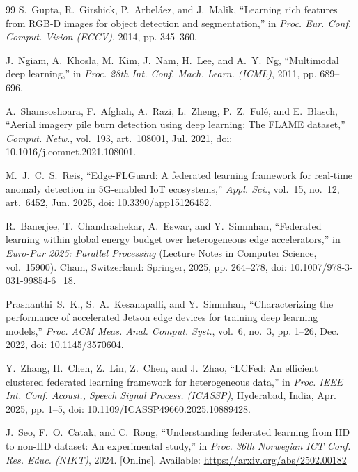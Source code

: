 \documentclass[journal]{IEEEtran}
\begin{document}
\begin{thebibliography}{99}
S.~Gupta, R.~Girshick, P.~Arbel\'{a}ez, and J.~Malik, ``Learning rich features from RGB-D images for object detection and segmentation,'' in \emph{Proc. Eur. Conf. Comput. Vision (ECCV)}, 2014, pp. 345--360.

J.~Ngiam, A.~Khosla, M.~Kim, J.~Nam, H.~Lee, and A.~Y.~Ng, ``Multimodal deep learning,'' in \emph{Proc. 28th Int. Conf. Mach. Learn. (ICML)}, 2011, pp. 689--696.


A.~Shamsoshoara, F.~Afghah, A.~Razi, L.~Zheng, P.~Z.~Ful\'{e}, and E.~Blasch, ``Aerial imagery pile burn detection using deep learning: The FLAME dataset,'' \emph{Comput. Netw.}, vol.~193, art.~108001, Jul. 2021, doi: 10.1016/j.comnet.2021.108001.

M.~J.~C.~S.~Reis, ``Edge-FLGuard: A federated learning framework for real-time anomaly detection in 5G-enabled IoT ecosystems,'' \emph{Appl. Sci.}, vol.~15, no.~12, art.~6452, Jun. 2025, doi: 10.3390/app15126452.

R.~Banerjee, T.~Chandrashekar, A.~Eswar, and Y.~Simmhan, ``Federated learning within global energy budget over heterogeneous edge accelerators,'' in \emph{Euro-Par 2025: Parallel Processing} (Lecture Notes in Computer Science, vol.~15900). Cham, Switzerland: Springer, 2025, pp. 264--278, doi: 10.1007/978-3-031-99854-6\_18.

Prashanthi~S.~K., S.~A.~Kesanapalli, and Y.~Simmhan, ``Characterizing the performance of accelerated Jetson edge devices for training deep learning models,'' \emph{Proc. ACM Meas. Anal. Comput. Syst.}, vol.~6, no.~3, pp. 1--26, Dec. 2022, doi: 10.1145/3570604.

Y.~Zhang, H.~Chen, Z.~Lin, Z.~Chen, and J.~Zhao, ``LCFed: An efficient clustered federated learning framework for heterogeneous data,'' in \emph{Proc. IEEE Int. Conf. Acoust., Speech Signal Process. (ICASSP)}, Hyderabad, India, Apr. 2025, pp. 1--5, doi: 10.1109/ICASSP49660.2025.10889428.

J.~Seo, F.~O.~Catak, and C.~Rong, ``Understanding federated learning from IID to non-IID dataset: An experimental study,'' in \emph{Proc. 36th Norwegian ICT Conf. Res. Educ. (NIKT)}, 2024. [Online]. Available: \url{https://arxiv.org/abs/2502.00182}


\end{thebibliography}
\end{document}
